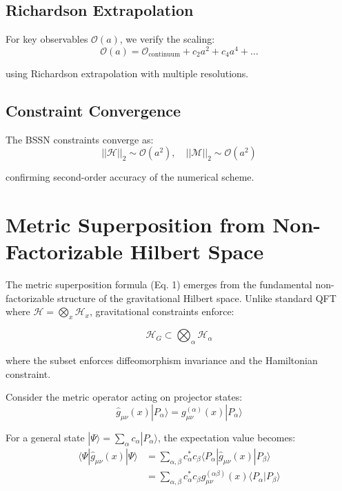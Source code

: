 \documentclass[11pt,a4paper]{article}
\begin{document}
\subsection{Richardson Extrapolation}

For key observables $\mathcal{O}(a)$, we verify the scaling:
\begin{equation}
\mathcal{O}(a) = \mathcal{O}_{\text{continuum}} + c_2 a^2 + c_4 a^4 + \ldots
\end{equation}

using Richardson extrapolation with multiple resolutions.

\subsection{Constraint Convergence}

The BSSN constraints converge as:
\begin{equation}
||\mathcal{H}||_2 \sim \mathcal{O}(a^2), \quad ||\mathcal{M}||_2 \sim \mathcal{O}(a^2)
\end{equation}

confirming second-order accuracy of the numerical scheme.

\section{Metric Superposition from Non-Factorizable Hilbert Space}
\label{app:derivation}

The metric superposition formula (Eq. 1) emerges from the fundamental non-factorizable structure of the gravitational Hilbert space. Unlike standard QFT where $\mathcal{H} = \bigotimes_x \mathcal{H}_x$, gravitational constraints enforce:

\begin{equation}
\mathcal{H}_G \subset \bigotimes_\alpha \mathcal{H}_\alpha
\end{equation}

where the subset enforces diffeomorphism invariance and the Hamiltonian constraint.

Consider the metric operator acting on projector states:
\begin{equation}
\hat{g}_{\mu\nu}(x) |P_\alpha\rangle = g_{\mu\nu}^{(\alpha)}(x) |P_\alpha\rangle
\end{equation}

For a general state $|\Psi\rangle = \sum_\alpha c_\alpha |P_\alpha\rangle$, the expectation value becomes:
\begin{align}
\langle \Psi | \hat{g}_{\mu\nu}(x) | \Psi \rangle &= \sum_{\alpha,\beta} c_\alpha^* c_\beta \langle P_\alpha | \hat{g}_{\mu\nu}(x) | P_\beta \rangle \\
&= \sum_{\alpha,\beta} c_\alpha^* c_\beta g_{\mu\nu}^{(\alpha\beta)}(x) \langle P_\alpha | P_\beta \rangle
\end{align}
\end{document}
